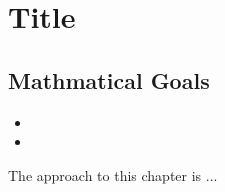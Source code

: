 \section{Title}
\subsection{Mathmatical Goals}

\begin{theorem}
	\begin{itemize}
		\item 
		\item
	\end{itemize}
\end{theorem}
The approach to this chapter is ...
